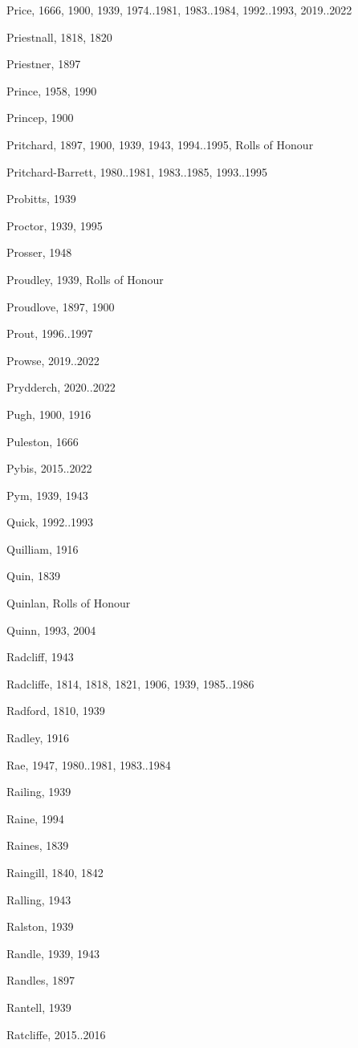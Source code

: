 \begin{theindex}
\item Price, 1666, 1900, 1939, 1974..1981, 1983..1984, 1992..1993, 2019..2022
\item Priestnall, 1818, 1820
\item Priestner, 1897
\item Prince, 1958, 1990
\item Princep, 1900
\item Pritchard, 1897, 1900, 1939, 1943, 1994..1995, Rolls of Honour
\item Pritchard-Barrett, 1980..1981, 1983..1985, 1993..1995
\item Probitts, 1939
\item Proctor, 1939, 1995
\item Prosser, 1948
\item Proudley, 1939, Rolls of Honour
\item Proudlove, 1897, 1900
\item Prout, 1996..1997
\item Prowse, 2019..2022
\item Prydderch, 2020..2022
\item Pugh, 1900, 1916
\item Puleston, 1666
\item Pybis, 2015..2022
\item Pym, 1939, 1943
\item Quick, 1992..1993
\item Quilliam, 1916
\item Quin, 1839
\item Quinlan, Rolls of Honour
\item Quinn, 1993, 2004
\item Radcliff, 1943
\item Radcliffe, 1814, 1818, 1821, 1906, 1939, 1985..1986
\item Radford, 1810, 1939
\item Radley, 1916
\item Rae, 1947, 1980..1981, 1983..1984
\item Railing, 1939
\item Raine, 1994
\item Raines, 1839
\item Raingill, 1840, 1842
\item Ralling, 1943
\item Ralston, 1939
\item Randle, 1939, 1943
\item Randles, 1897
\item Rantell, 1939
\item Ratcliffe, 2015..2016

\end{theindex}
